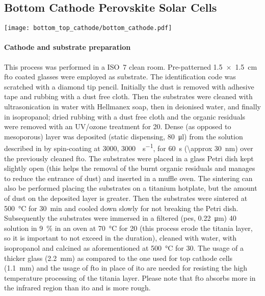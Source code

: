 		\FloatBarrier
	\subsection{Bottom Cathode Perovskite Solar Cells}\label{methods_bottom}

		\begin{SCfigure}
			\centering
			\texttt{[image: bottom\_top\_cathode/bottom\_cathode.pdf]}
			\label{fig:bottom_cathode}
		\end{SCfigure}

		\paragraph{Cathode and  substrate preparation}
		This process was performed in a ISO~7 clean room.
		Pre-patterned \SI{1.5 x 1.5}{\cm} \gls{fto} coated glasses were employed as substrate.
		The identification code was scratched with a diamond tip pencil.
		Initially the dust is removed with adhesive tape and rubbing with a dust free cloth.
		Then the substrates were cleaned with ultrasonication in water with Hellmanex soap, then in deionised water, and finally in isopropanol; dried rubbing with a dust free cloth and the organic residuals were removed with an UV/ozone treatment for \SI{20}{\min}.
		Dense (as opposed to mesoporous)  layer was deposited (static dispensing, \SI{80}{\ul}) from the solution described in  by spin-coating at \SI{3000}{\rpm}, \SI{3000}{\rpm\per\s}, for \SI{60}{\s} (\SI{\approx 30}{\nm}) over the previously cleaned \gls{fto}.
		The substrates were placed in a glass Petri dish kept slightly open (this helps the removal of the burnt organic residuals and manages to reduce the entrance of dust) and inserted in a muffle oven.
		The sintering can also be performed placing the substrates on a titanium hotplate, but the amount of dust on the deposited layer is greater.
		Then the substrates were sintered at \SI{500}{\celsius} for \SI{30}{\minute} and cooled down slowly for not breaking the Petri dish.
		Subsequently the substrates were immersed in a filtered (\gls{pes}, \SI{0.22}{\um}) \SI{40}{\milli\Molar}
		 solution in 9~\%  in an oven at \SI{70}{\celsius} for \SI{20}{\min} (this process erode the titania layer, so it is important to not exceed in the duration), cleaned with water, with isopropanol and calcined as aforementioned at \SI{500}{\celsius} for \SI{30}{\min}.
		The usage of a thicker glass (\SI{2.2}{\mm}) as compared to the one used for top cathode cells (\SI{1.1}{\mm}) and the usage of \gls{fto} in place of \gls{ito} are needed for resisting the high temperature processing of the titania layer.
		Please note that \gls{fto} absorbs more in the infrared region than \gls{ito} and is more rough.


